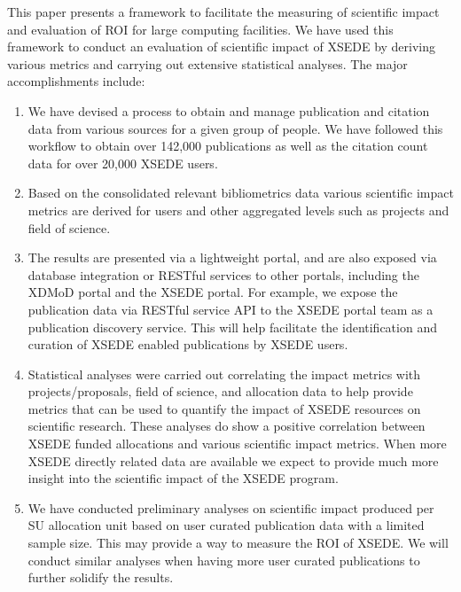 \documentclass{sig-alternate}
\begin{document}
This paper presents a framework to facilitate the measuring of
scientific impact and evaluation of ROI for large computing
facilities. We have used this framework to conduct an evaluation of
scientific impact of XSEDE by deriving various metrics and carrying
out extensive statistical analyses. The major accomplishments include:

\begin{enumerate}

\item We have devised a process to obtain and manage publication and
  citation data from various sources for a given group of people. We
  have followed this workflow to obtain over 142,000 publications as
  well as the citation count data for over 20,000 XSEDE users.

\item Based on the consolidated relevant bibliometrics data various
  scientific impact metrics are derived for users and other aggregated
  levels such as projects and field of science.

\item The results are presented via a lightweight portal, and are also
  exposed via database integration or RESTful services to other
  portals, including the XDMoD portal and the XSEDE portal. For
  example, we expose the publication data via RESTful service API to
  the XSEDE portal team as a publication discovery service. This will
  help facilitate the identification and curation of XSEDE enabled
  publications by XSEDE users.

\item Statistical analyses were carried out correlating the impact
  metrics with projects/proposals, field of science, and allocation
  data to help provide metrics that can be used to quantify the impact
  of XSEDE resources on scientific research. These analyses do show a
  positive correlation between XSEDE funded allocations and various
  scientific impact metrics. When more XSEDE directly related data are
  available we expect to provide much more insight into the scientific
  impact of the XSEDE program.

\item We have conducted preliminary analyses on scientific impact
  produced per SU allocation unit based on user curated publication
  data with a limited sample size. This may provide a way to measure
  the ROI of XSEDE. We will conduct similar analyses when having more
  user curated publications to further solidify the results.

\end{enumerate} 
\end{document}
